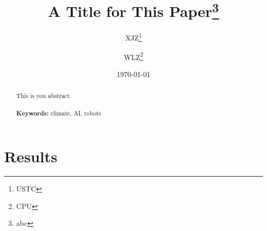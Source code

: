 \documentclass[a4paper, 12pt]{article}
\begin{document}
\begin{titlepage}
    \title{A Title for This Paper\thanks{abc}}
    \author{XJZ\thanks{USTC} \and WLZ\thanks{CPU}}
    \date{\today}
    \maketitle
    \begin{abstract}
        \noindent
        This is you abstract.
        \\
        \vspace{0in}\\
        \noindent\textbf{Keywords:} climate, AI, robots\\
        \bigskip
    \end{abstract}
    \setcounter{page}{0}
    \thispagestyle{empty}
\end{titlepage}
\pagebreak \newpage
\doublespacing

\section{Results}\label{sec:results}

\clearpage
\end{document}
